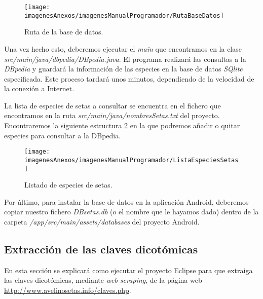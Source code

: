 \begin{figure}[h]
    \begin{center}%
        \begin{center}%
          \texttt{[image: imagenesAnexos/imagenesManualProgramador/RutaBaseDatos]}%
          \caption{Ruta de la base de datos.}%
          \label{figRutaBaseDatos}%
        \end{center}%
  	\end{center}%
\end{figure}%

Una vez hecho esto, deberemos ejecutar el \textit{main} que encontramos en la clase \textit{src/main/java/dbpedia/DBpedia.java}. El programa realizará las consultas a la \textit{DBpedia} y guardará la información de las especies en la base de datos \textit{SQlite} especificada. Este proceso tardará unos minutos, dependiendo de la velocidad de la conexión a Internet.

La lista de especies de setas a consultar se encuentra en el fichero que encontramos en la ruta \textit{src/main/java/nombresSetas.txt} del proyecto.
Encontraremos la siguiente estructura \ref{figListaEspeciesSetas} en la que podremos añadir o quitar especies para consultar a la DBpedia. 

\begin{figure}[h]
    \begin{center}%
        \begin{center}%
          \texttt{[image: imagenesAnexos/imagenesManualProgramador/ListaEspeciesSetas]}%
          \caption{Listado de especies de setas.}%
          \label{figListaEspeciesSetas}%
        \end{center}%
  	\end{center}%
\end{figure}%

Por último, para instalar la base de datos en la aplicación Android, deberemos copiar nuestro fichero \textit{DBsetas.db} (o el nombre que le hayamos dado) dentro de la carpeta \textit{/app/src/main/assets/databases} del proyecto Android.
\clearpage

\subsection{Extracción de las claves dicotómicas}

En esta sección se explicará como ejecutar el proyecto Eclipse para que extraiga las claves dicotómicas, mediante \textit{web scraping}, de la página web \url{http://www.avelinosetas.info/claves.php}.

